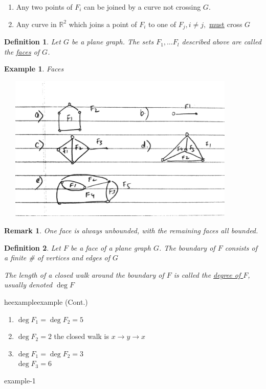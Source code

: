 \documentclass[12pt]{article}
\makeatletter
\newtheorem{example}{Example}
\newtheorem{definition}{Definition}
\newtheorem*{remark}{Remark}
\newenvironment{usecounterof}[2]{%
  \def\@tempb{#1}%
  \expandafter\renewcommand\csname the#1\endcsname{\ref{#2}}\@nameuse\@tempb}{%
    \@nameuse{end\@tempb}\addtocounter\@tempb{-1}}
\makeatother
\begin{document}
\begin{enumerate}
	\item Any two points of $F_{i}$ can be joined by a curve not crossing $G$.
	\item Any curve in $\mathbb{R}^{2}$ which joins a point of $F_{i}$ to one of $F_{j}, i\neq j, $ \underline{must} cross $G$
\end{enumerate}


\begin{definition}
	Let $G$ be a plane graph. The sets $F_{1}, \dots F_{l}$ described above are called the \underline{faces} of $G$.
\end{definition}

\begin{example}\label{a-thm}
	Faces

	\begin{center}
		\includegraphics[width=12cm, height=7cm]{example2}
	\end{center}

\end{example}

\begin{remark}
	One face is always unbounded, with the remaining faces all bounded.
\end{remark}


\begin{definition}
	Let $F$ be a face of a plane graph $G$. The boundary of $F$ consists of a finite \# of vertices and edges of $G$

	The length of a closed walk around the boundary of $F$ is called the \underline{degree of $F$}, usually denoted $\deg F$

\end{definition}


\begin{usecounterof}{example}{a-thm} (Cont.)
	\begin{enumerate}
		\item $\deg F_{1} = \deg F_{2} = 5$
		\item $\deg F_{2} = 2$ the closed walk is $x\to y \to x$
		\item $\deg F_{1} = \deg F_{2} = 3$\\
		      $\deg F_{3} = 6$
	\end{enumerate}


\end{usecounterof}
\end{document}
